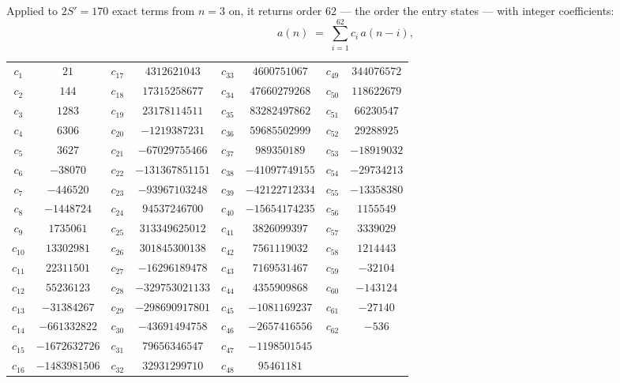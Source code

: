 \documentclass[11pt,a4paper]{article}
\theoremstyle{plain}
\theoremstyle{definition}
\begin{document}
Applied to $2S'=170$ exact terms from $n=3$ on, it returns order $62$ --- the
order the entry states --- with integer coefficients:
\[
a(n)\;=\;\sum_{i=1}^{62}c_i\,a(n-i),
\]
\begin{center}\small
\begin{tabular}{cccccccc}
$c_{1}$ & $21$ & $c_{17}$ & $4312621043$ & $c_{33}$ & $4600751067$ & $c_{49}$ & $344076572$ \\
$c_{2}$ & $144$ & $c_{18}$ & $17315258677$ & $c_{34}$ & $47660279268$ & $c_{50}$ & $118622679$ \\
$c_{3}$ & $1283$ & $c_{19}$ & $23178114511$ & $c_{35}$ & $83282497862$ & $c_{51}$ & $66230547$ \\
$c_{4}$ & $6306$ & $c_{20}$ & $-1219387231$ & $c_{36}$ & $59685502999$ & $c_{52}$ & $29288925$ \\
$c_{5}$ & $3627$ & $c_{21}$ & $-67029755466$ & $c_{37}$ & $989350189$ & $c_{53}$ & $-18919032$ \\
$c_{6}$ & $-38070$ & $c_{22}$ & $-131367851151$ & $c_{38}$ & $-41097749155$ & $c_{54}$ & $-29734213$ \\
$c_{7}$ & $-446520$ & $c_{23}$ & $-93967103248$ & $c_{39}$ & $-42122712334$ & $c_{55}$ & $-13358380$ \\
$c_{8}$ & $-1448724$ & $c_{24}$ & $94537246700$ & $c_{40}$ & $-15654174235$ & $c_{56}$ & $1155549$ \\
$c_{9}$ & $1735061$ & $c_{25}$ & $313349625012$ & $c_{41}$ & $3826099397$ & $c_{57}$ & $3339029$ \\
$c_{10}$ & $13302981$ & $c_{26}$ & $301845300138$ & $c_{42}$ & $7561119032$ & $c_{58}$ & $1214443$ \\
$c_{11}$ & $22311501$ & $c_{27}$ & $-16296189478$ & $c_{43}$ & $7169531467$ & $c_{59}$ & $-32104$ \\
$c_{12}$ & $55236123$ & $c_{28}$ & $-329753021133$ & $c_{44}$ & $4355909868$ & $c_{60}$ & $-143124$ \\
$c_{13}$ & $-31384267$ & $c_{29}$ & $-298690917801$ & $c_{45}$ & $-1081169237$ & $c_{61}$ & $-27140$ \\
$c_{14}$ & $-661332822$ & $c_{30}$ & $-43691494758$ & $c_{46}$ & $-2657416556$ & $c_{62}$ & $-536$ \\
$c_{15}$ & $-1672632726$ & $c_{31}$ & $79656346547$ & $c_{47}$ & $-1198501545$ &  &  \\
$c_{16}$ & $-1483981506$ & $c_{32}$ & $32931299710$ & $c_{48}$ & $95461181$ &  &  \\
\end{tabular}
\end{center}
\end{document}
